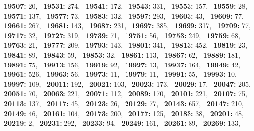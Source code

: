 \textbf{19507:} 20,\allowbreak~ 
\textbf{19531:} 274,\allowbreak~ 
\textbf{19541:} 172,\allowbreak~ 
\textbf{19543:} 331,\allowbreak~ 
\textbf{19553:} 157,\allowbreak~ 
\textbf{19559:} 28,\allowbreak~ 
\textbf{19571:} 137,\allowbreak~ 
\textbf{19577:} 73,\allowbreak~ 
\textbf{19583:} 132,\allowbreak~ 
\textbf{19597:} 293,\allowbreak~ 
\textbf{19603:} 43,\allowbreak~ 
\textbf{19609:} 77,\allowbreak~ 
\textbf{19661:} 267,\allowbreak~ 
\textbf{19681:} 143,\allowbreak~ 
\textbf{19687:} 231,\allowbreak~ 
\textbf{19697:} 385,\allowbreak~ 
\textbf{19699:} 317,\allowbreak~ 
\textbf{19709:} 77,\allowbreak~ 
\textbf{19717:} 32,\allowbreak~ 
\textbf{19727:} 319,\allowbreak~ 
\textbf{19739:} 71,\allowbreak~ 
\textbf{19751:} 56,\allowbreak~ 
\textbf{19753:} 249,\allowbreak~ 
\textbf{19759:} 68,\allowbreak~ 
\textbf{19763:} 21,\allowbreak~ 
\textbf{19777:} 209,\allowbreak~ 
\textbf{19793:} 143,\allowbreak~ 
\textbf{19801:} 341,\allowbreak~ 
\textbf{19813:} 452,\allowbreak~ 
\textbf{19819:} 23,\allowbreak~ 
\textbf{19841:} 89,\allowbreak~ 
\textbf{19843:} 59,\allowbreak~ 
\textbf{19853:} 32,\allowbreak~ 
\textbf{19861:} 113,\allowbreak~ 
\textbf{19867:} 62,\allowbreak~ 
\textbf{19889:} 181,\allowbreak~ 
\textbf{19891:} 75,\allowbreak~ 
\textbf{19913:} 156,\allowbreak~ 
\textbf{19919:} 92,\allowbreak~ 
\textbf{19927:} 13,\allowbreak~ 
\textbf{19937:} 164,\allowbreak~ 
\textbf{19949:} 42,\allowbreak~ 
\textbf{19961:} 526,\allowbreak~ 
\textbf{19963:} 56,\allowbreak~ 
\textbf{19973:} 11,\allowbreak~ 
\textbf{19979:} 11,\allowbreak~ 
\textbf{19991:} 55,\allowbreak~ 
\textbf{19993:} 10,\allowbreak~ 
\textbf{19997:} 109,\allowbreak~ 
\textbf{20011:} 192,\allowbreak~ 
\textbf{20021:} 103,\allowbreak~ 
\textbf{20023:} 173,\allowbreak~ 
\textbf{20029:} 17,\allowbreak~ 
\textbf{20047:} 205,\allowbreak~ 
\textbf{20051:} 70,\allowbreak~ 
\textbf{20063:} 221,\allowbreak~ 
\textbf{20071:} 112,\allowbreak~ 
\textbf{20089:} 170,\allowbreak~ 
\textbf{20101:} 221,\allowbreak~ 
\textbf{20107:} 75,\allowbreak~ 
\textbf{20113:} 137,\allowbreak~ 
\textbf{20117:} 45,\allowbreak~ 
\textbf{20123:} 26,\allowbreak~ 
\textbf{20129:} 77,\allowbreak~ 
\textbf{20143:} 657,\allowbreak~ 
\textbf{20147:} 210,\allowbreak~ 
\textbf{20149:} 46,\allowbreak~ 
\textbf{20161:} 104,\allowbreak~ 
\textbf{20173:} 200,\allowbreak~ 
\textbf{20177:} 125,\allowbreak~ 
\textbf{20183:} 38,\allowbreak~ 
\textbf{20201:} 48,\allowbreak~ 
\textbf{20219:} 2,\allowbreak~ 
\textbf{20231:} 292,\allowbreak~ 
\textbf{20233:} 94,\allowbreak~ 
\textbf{20249:} 161,\allowbreak~ 
\textbf{20261:} 89,\allowbreak~ 
\textbf{20269:} 133,\allowbreak~ 
